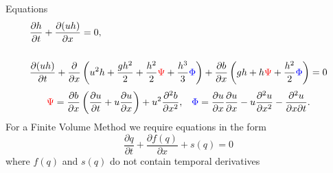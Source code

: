 \documentclass[handout]{beamer}
\begin{document}
\begin{frame}{Equations}
		\begin{subequations}
			\begin{align*}
			&\frac{\partial h}{\partial t} + \dfrac{\partial (uh)}{\partial x} = 0,  \\ \\
			&\dfrac{\partial (uh)}{\partial t} + \dfrac{\partial}{\partial x} \left ( u^2h + \dfrac{gh^2}{2} + \dfrac{h^2}{2}{ \color{red}\Psi } + \dfrac{h^3}{3}{ { \color{blue} \Phi } }  \right )  +  \dfrac{\partial b}{\partial x} \left (gh +   h { \color{red}\Psi } + \dfrac{h^2}{2}{ { \color{blue} \Phi } }  \right ) = 0
			\end{align*}
		\end{subequations}
				\begin{align*}
				&{ \color{red}\Psi }  = \dfrac{\partial b}{\partial x}\left(\dfrac{\partial u}{\partial t} + u\dfrac{\partial u}{\partial x} \right)  + u^2\dfrac{\partial^2 b}{\partial x^2}, &
				{ \color{blue} \Phi }  = \dfrac{\partial u }{\partial x} \dfrac{\partial u}{\partial x} -u \dfrac{\partial^2 u}{\partial x^2}  - \dfrac{\partial^2 u}{\partial x \partial t} .
				\end{align*}
	\pause
	For a Finite Volume Method we require equations in the form
	\begin{equation*}
	\frac{\partial q}{\partial t} + \frac{\partial f(q)}{\partial x} + s(q) = 0
	\end{equation*}
	where $f(q)$ and $s(q)$ do not contain temporal derivatives
\end{frame}
\end{document}
